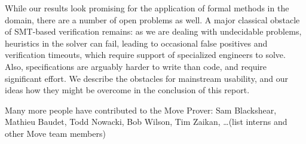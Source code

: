 While our results look promising for the application of formal methods in the
domain, there are a number of open problems as well.  A major classical obstacle
of SMT-based verification remains: as we are dealing with undecidable problems,
heuristics in the solver can fail, leading to occasional false positives and
verification timeouts, which require support of specialized engineers to
solve. Also, specifications are arguably harder to write than code, and require
significant effort.  We describe the obstacles for mainstream usability, and our
ideas how they might be overcome in the conclusion of this report.

 Many more people have contributed to the Move
Prover: Sam Blackshear, Mathieu Baudet, Todd Nowacki, Bob Wilson, Tim Zaikan,
\ldots (list interns and other Move team members)



